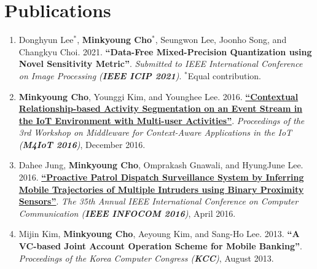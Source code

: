 \documentclass[letterpaper,oneside,11pt]{article}
\begin{document}
\section{Publications}
\begin{enumerate}[leftmargin=*, itemsep=0em]
  \item \small Donghyun Lee$^\ast$, \textbf{Minkyoung Cho$^\ast$}, Seungwon Lee, Joonho Song, and Changkyu Choi. 2021. \textbf{{``Data-Free Mixed-Precision Quantization using Novel Sensitivity Metric''}}. \textit{Submitted to IEEE International Conference on Image Processing (\textbf{IEEE ICIP 2021})}. $^\ast$Equal contribution.
  \item \small \textbf{Minkyoung Cho}, Younggi Kim, and Younghee Lee. 2016. \textbf{\href{https://dl.acm.org/doi/10.1145/3008631.3008633}{``Contextual Relationship-based Activity Segmentation on an Event Stream in the IoT Environment with Multi-user Activities''}}. \textit{Proceedings of the 3rd Workshop on Middleware for Context-Aware Applications in the IoT (\textbf{M4IoT 2016})}, December 2016.
  \item \small Dahee Jung, \textbf{Minkyoung Cho}, Omprakash Gnawali, and HyungJune Lee. 2016. \textbf{\href{https://ieeexplore.ieee.org/abstract/document/7524369}{``Proactive Patrol Dispatch Surveillance System by Inferring Mobile Trajectories of Multiple Intruders using Binary Proximity Sensors''}}. \textit{The 35th Annual IEEE International Conference on Computer Communication (\textbf{IEEE INFOCOM 2016})}, April 2016.
  \item \small Mijin Kim, \textbf{Minkyoung Cho}, Aeyoung Kim, and Sang-Ho Lee. 2013. \textbf{``A VC-based Joint Account Operation Scheme for Mobile Banking''}. \textit{Proceedings of the Korea Computer Congress (\textbf{KCC})}, August 2013.
\end{enumerate}

\end{document}
